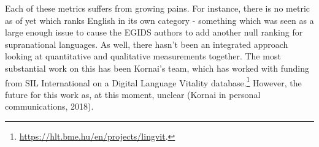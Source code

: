Each of these metrics suffers from growing pains. For instance, there is no metric as of yet which ranks English in its own category - something which was seen as a large enough issue to cause the EGIDS authors to add another null ranking for supranational languages. %
As well, there hasn't been an integrated approach looking at quantitative and qualitative measurements together. The most substantial work on this has been Kornai's team, which has worked with funding from SIL International on a Digital Language Vitality database.\footnote{\href{https://hlt.bme.hu/en/projects/lingvit}{https://hlt.bme.hu/en/projects/lingvit}. } However, the future for this work as, at this moment, unclear (Kornai in personal communications, 2018).



